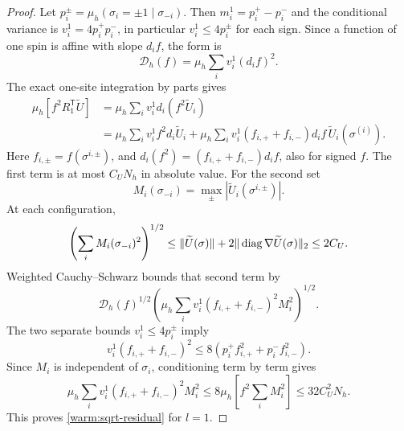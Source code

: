 \begin{proof}
Let \(p_i^\pm=\mu_h(\sigma_i=\pm1\mid\sigma_{-i})\).
Then \(m_i^1=p_i^+-p_i^-\) and the conditional variance is
\(v_i^1=4p_i^+p_i^-\), in particular \(v_i^1\le4p_i^\pm\)
for each sign.  Since a function of one spin is affine with slope
\(d_if\), the form is
\[
 \mathcal D_h(f)=\mu_h\sum_i v_i^1(d_if)^2 .
\]
The exact one-site integration by parts
\cite[Equation~(6.31)]{SG} gives
\begin{align*}
 \mu_h[f^2R_1^{\mathsf T}\widetilde U]
 &=\mu_h\sum_i v_i^1d_i(f^2\widetilde U_i)\\
 &=\mu_h\sum_i v_i^1 f^2d_i\widetilde U_i
   +\mu_h\sum_i v_i^1(f_{i,+}+f_{i,-})d_if\,
                                  \widetilde U_i(\sigma^{(i)}).
\end{align*}
Here \(f_{i,\pm}=f(\sigma^{i,\pm})\), and
\(d_i(f^2)=(f_{i,+}+f_{i,-})d_if\), also for signed \(f\).
The first term is at most \(C_UN_h\) in absolute value.
For the second set
\[
 M_i(\sigma_{-i})=\max_\pm|\widetilde U_i(\sigma^{i,\pm})|.
\]
At each configuration,
\[
 \left(\sum_iM_i(\sigma_{-i})^2\right)^{1/2}
 \le\|\widetilde U(\sigma)\|
       +2\|\operatorname{diag}\nabla\widetilde U(\sigma)\|_2\le 2C_U.
\]
Weighted Cauchy--Schwarz bounds that second term by
\[
 \mathcal D_h(f)^{1/2}
 \left(\mu_h\sum_i v_i^1(f_{i,+}+f_{i,-})^2M_i^2\right)^{1/2}.
\]
The two separate bounds \(v_i^1\le4p_i^\pm\) imply
\[
 v_i^1(f_{i,+}+f_{i,-})^2
       \le8(p_i^+f_{i,+}^2+p_i^-f_{i,-}^2).
\]
Since \(M_i\) is independent of \(\sigma_i\), conditioning term by
term gives
\[
 \mu_h\sum_i v_i^1(f_{i,+}+f_{i,-})^2M_i^2
       \le8\mu_h\!\left[f^2\sum_iM_i^2\right]\le32C_U^2N_h .
\]
This proves \eqref{warm:sqrt-residual} for \(l=1\).


\end{proof}
